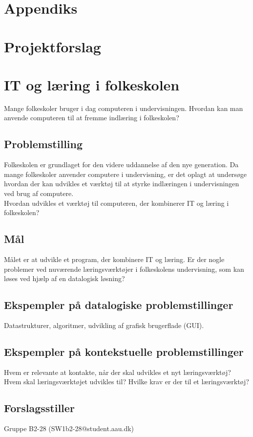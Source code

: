 \section{Appendiks}
\section*{Projektforslag}
\section*{IT og læring i folkeskolen}
Mange folkeskoler bruger i dag computeren i undervisningen. Hvordan kan man anvende computeren til at fremme indlæring i folkeskolen?

\subsection*{Problemstilling}
Folkeskolen er grundlaget for den videre uddannelse af den nye generation. Da mange folkeskoler anvender computere i undervisning, er det oplagt at undersøge hvordan der kan udvikles et værktøj til at styrke indlæringen i undervisningen ved brug af computere. \\
Hvordan udvikles et værktøj til computeren, der kombinerer IT og læring i folkeskolen?

\subsection*{Mål}
Målet er at udvikle et program, der kombinere IT og læring. Er der nogle problemer ved nuværende læringsværktøjer i folkeskolens undervisning, som kan løses ved hjælp af en datalogisk løsning?

\subsection*{Ekspempler på datalogiske problemstillinger}
Datastrukturer, algoritmer, udvikling af grafisk brugerflade (GUI).

\subsection*{Ekspempler på kontekstuelle problemstillinger}
Hvem er relevante at kontakte, når der skal udvikles et nyt læringsværktøj? Hvem skal læringsværktøjet udvikles til? Hvilke krav er der til et læringsværktøj? 


\subsection*{Forslagsstiller}
Gruppe B2-28 (SW1b2-28@student.aau.dk)
\clearpage